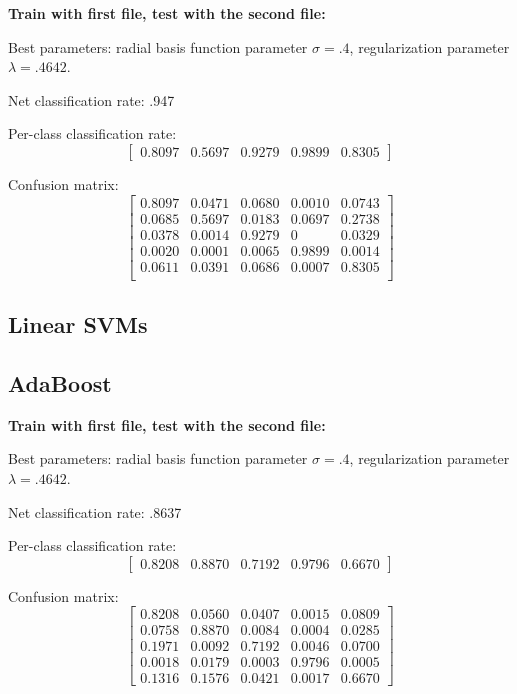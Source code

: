 \documentclass[letterpaper]{article}
\begin{document}
\textbf{Train with first file, test with the second file:}

Best parameters: radial basis function parameter $\sigma=.4$, regularization parameter $\lambda=.4642$.

Net classification rate: .947

Per-class classification rate: 
$$\begin{bmatrix}0.8097  &  0.5697   & 0.9279   & 0.9899  &  0.8305\end{bmatrix}$$

Confusion matrix:
$$\begin{bmatrix}
0.8097&    0.0471&    0.0680  &  0.0010  &  0.0743\\
    0.0685&    0.5697&    0.0183&    0.0697  &  0.2738\\
    0.0378   & 0.0014&    0.9279  &       0 &   0.0329\\
    0.0020 &   0.0001 &   0.0065 &   0.9899  &  0.0014\\
    0.0611   & 0.0391  &  0.0686  &  0.0007&    0.8305\\
\end{bmatrix}$$


\subsection*{Linear SVMs}

\subsection*{AdaBoost}

\textbf{Train with first file, test with the second file:}

Best parameters: radial basis function parameter $\sigma=.4$, regularization parameter $\lambda=.4642$.

Net classification rate: .8637

Per-class classification rate: 
$$\begin{bmatrix}0.8208   & 0.8870  &  0.7192   & 0.9796 &   0.6670\end{bmatrix}$$

Confusion matrix:
$$\begin{bmatrix}
0.8208 &   0.0560  & 0.0407 &   0.0015  &  0.0809\\
    0.0758&    0.8870 &   0.0084&    0.0004 &   0.0285\\
    0.1971   & 0.0092   & 0.7192  &  0.0046   & 0.0700\\
    0.0018   & 0.0179    &0.0003  &  0.9796  &  0.0005\\
    0.1316   &0.1576    &0.0421  &  0.0017  &  0.6670
\end{bmatrix}$$
\end{document}
